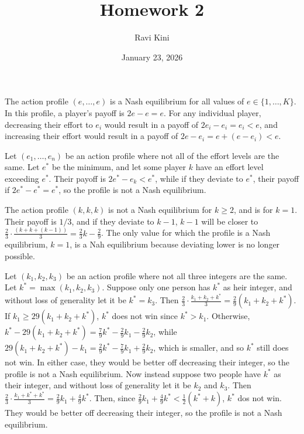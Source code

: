 \documentclass{article}
\title{Homework 2}
\author{Ravi Kini}
\date{January 23, 2026}
\begin{document}
\maketitle

\problem{}
The action profile $(e, \ldots, e)$ is a Nash equilibrium for all values of $e \in \{1, \ldots, K\}$. In this profile, a player's payoff is $2e - e = e$. For any individual player, decreasing their effort to $e_i$ would result in a payoff of $2e_i - e_i = e_i < e$, and increasing their effort would result in a payoff of $2e - e_i = e + (e - e_i) < e$.

Let $(e_1, \ldots, e_n)$ be an action profile where not all of the effort levels are the same. Let $e^*$ be the minimum, and let some player $k$ have an effort level exceeding $e^*$. Their payoff is $2e^* - e_k < e^*$, while if they deviate to $e^*$, their payoff if $2e^* - e^* = e^*$, so the profile is not a Nash equilibrium.

\clearpage
\problem{}
The action profile $(k, k, k)$ is not a Nash equilibrium for $k \geq 2$, and is for $k = 1$. Their payoff is $1/3$, and if they deviate to $k - 1$, $k - 1$ will be closer to $\frac{2}{3} \cdot \frac{(k + k + (k - 1))}{3} = \frac{2}{3}k - \frac{2}{9}$. The only value for which the profile is a Nash equilibrium, $k = 1$, is a Nah equilibrium because deviating lower is no longer possible.

Let $(k_1, k_2, k_3)$ be an action profile where not all three integers are the same. Let $k^* = \max(k_1, k_2, k_3)$. Suppose only one person has $k^*$ as heir integer, and without loss of generality let it be $k^* = k_3$. Then $\frac{2}{3} \cdot \frac{k_1 + k_2 + k^*}{3} = \frac{2}{9}(k_1 + k_2 + k^*)$. If $k_1 \geq {2}{9}(k_1 + k_2 + k^*)$, $k^*$ does not win since $k^* > k_1$. Otherwise, $k^* - {2}{9}(k_1 + k_2 + k^*) = \frac{7}{9}k^* - \frac{2}{9}k_1 - \frac{2}{9}k_2$, while ${2}{9}(k_1 + k_2 + k^*) - k_1 = \frac{2}{9}k^* - \frac{7}{9}k_1 + \frac{2}{9}k_2$, which is smaller, and so $k^*$ still does not win. In either case, they would be better off decreasing their integer, so the profile is not a Nash equilibrium. Now instead suppose two people have $k^*$ as their integer, and without loss of generality let it be $k_2$ and $k_3$. Then $\frac{2}{3} \cdot \frac{k_1 + k^* + k^*}{3} = \frac{2}{9}k_1 + \frac{4}{9}k^*$. Then, since $\frac{2}{9}k_1 + \frac{4}{9}k^* < \frac{1}{2}(k^* + k)$, $k^*$ dos not win. They would be better off decreasing their integer, so the profile is not a Nash equilibrium.
\end{document}
